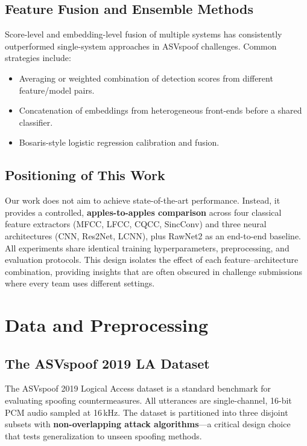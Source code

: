 \documentclass[12pt]{report}
\begin{document}
\section{Feature Fusion and Ensemble Methods}

Score-level and embedding-level fusion of multiple systems has consistently outperformed
single-system approaches in ASVspoof challenges. Common strategies include:
\begin{itemize}[noitemsep]
    \item Averaging or weighted combination of detection scores from different feature/model pairs.
    \item Concatenation of embeddings from heterogeneous front-ends before a shared classifier.
    \item Bosaris-style logistic regression calibration and fusion.
\end{itemize}

\section{Positioning of This Work}

Our work does not aim to achieve state-of-the-art performance. Instead, it provides a controlled,
\textbf{apples-to-apples comparison} across four classical feature extractors (MFCC, LFCC, CQCC,
SincConv) and three neural architectures (CNN, Res2Net, LCNN), plus RawNet2 as an end-to-end
baseline. All experiments share identical training hyperparameters, preprocessing, and evaluation
protocols. This design isolates the effect of each feature--architecture combination, providing
insights that are often obscured in challenge submissions where every team uses different settings.


\chapter{Data and Preprocessing}

\section{The ASVspoof 2019 LA Dataset}

The ASVspoof 2019 Logical Access dataset is a standard benchmark for evaluating spoofing
countermeasures. All utterances are single-channel, 16-bit PCM audio sampled at 16\,kHz.
The dataset is partitioned into three disjoint subsets with \textbf{non-overlapping attack
algorithms}---a critical design choice that tests generalization to unseen spoofing methods.
\end{document}
